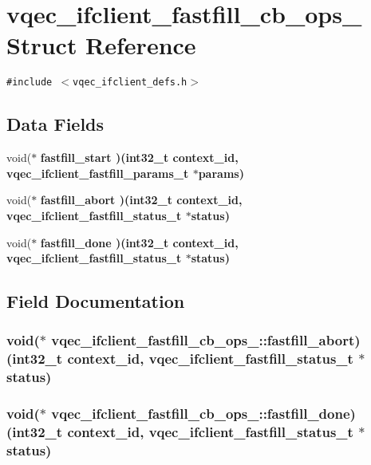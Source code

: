 \section{vqec\_\-ifclient\_\-fastfill\_\-cb\_\-ops\_\- Struct Reference}
\label{structvqec__ifclient__fastfill__cb__ops__}
{\tt \#include $<$vqec\_\-ifclient\_\-defs.h$>$}

\subsection*{Data Fields}
\begin{CompactItemize}
\item 
void($\ast$ \bf{fastfill\_\-start} )(int32\_\-t context\_\-id, \bf{vqec\_\-ifclient\_\-fastfill\_\-params\_\-t} $\ast$params)
\item 
void($\ast$ \bf{fastfill\_\-abort} )(int32\_\-t context\_\-id, \bf{vqec\_\-ifclient\_\-fastfill\_\-status\_\-t} $\ast$status)
\item 
void($\ast$ \bf{fastfill\_\-done} )(int32\_\-t context\_\-id, \bf{vqec\_\-ifclient\_\-fastfill\_\-status\_\-t} $\ast$status)
\end{CompactItemize}


\subsection{Field Documentation}
\subsubsection{\setlength{\rightskip}{0pt plus 5cm}void($\ast$ \bf{vqec\_\-ifclient\_\-fastfill\_\-cb\_\-ops\_\-::fastfill\_\-abort})(int32\_\-t context\_\-id, \bf{vqec\_\-ifclient\_\-fastfill\_\-status\_\-t} $\ast$status)}\label{structvqec__ifclient__fastfill__cb__ops___530e33ceaf0de0971738969f17765d2c}


\subsubsection{\setlength{\rightskip}{0pt plus 5cm}void($\ast$ \bf{vqec\_\-ifclient\_\-fastfill\_\-cb\_\-ops\_\-::fastfill\_\-done})(int32\_\-t context\_\-id, \bf{vqec\_\-ifclient\_\-fastfill\_\-status\_\-t} $\ast$status)}\label{structvqec__ifclient__fastfill__cb__ops___697c62da20e8fe79cdec7b6d1061177c}


